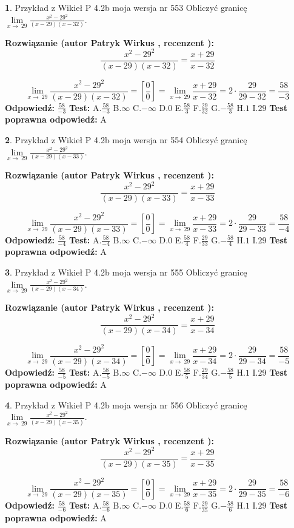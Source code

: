 \documentclass[12pt, a4paper]{article}
\theoremstyle{definition} %
\newtheorem{zad}{}
\newcommand{\zadStart}[1]{\begin{zad}#1\newline}
\newcommand{\zadStop}{\end{zad}}
\newcommand{\rozwStart}[2]{\noindent \textbf{Rozwiązanie (autor #1 , recenzent #2): }\newline}
\newcommand{\rozwStop}{\newline}
\newcommand{\odpStart}{\noindent \textbf{Odpowiedź:}\newline}
\newcommand{\odpStop}{\newline}
\newcommand{\testStart}{\noindent \textbf{Test:}\newline}
\newcommand{\testStop}{\newline}
\newcommand{\kluczStart}{\noindent \textbf{Test poprawna odpowiedź:}\newline}
\newcommand{\kluczStop}{\newline}
\begin{document}
\zadStart{Przykład z Wikieł P 4.2b moja wersja nr 553}
Obliczyć granicę $\lim\limits_{x\to\ 29}\frac{x^{2}-29^{2}}{(x-29)(x-32)}$.
\zadStop
\rozwStart{Patryk Wirkus}{}
$$\frac{x^{2}-29^{2}}{(x-29)(x-32)}=\frac{x+29}{x-32}$$

$$\lim\limits_{x\to\ 29}\frac{x^{2}-29^{2}}{(x-29)(x-32)}=[\frac{0}{0}]=\lim\limits_{x\to\ 29}\frac{x+29}{x-32}=2 \cdot \frac{29}{29-32} = \frac{58}{-3}$$
\rozwStop
\odpStart
$\frac{58}{-3}$
\odpStop
\testStart
A.$\frac{58}{-3}$
B.$\infty$
C.$-\infty$
D.$0$
E.$\frac{58}{3}$
F.$\frac{29}{32}$
G.$-\frac{58}{3}$
H.$1$
I.$29$
\testStop
\kluczStart
A
\kluczStop



\zadStart{Przykład z Wikieł P 4.2b moja wersja nr 554}
Obliczyć granicę $\lim\limits_{x\to\ 29}\frac{x^{2}-29^{2}}{(x-29)(x-33)}$.
\zadStop
\rozwStart{Patryk Wirkus}{}
$$\frac{x^{2}-29^{2}}{(x-29)(x-33)}=\frac{x+29}{x-33}$$

$$\lim\limits_{x\to\ 29}\frac{x^{2}-29^{2}}{(x-29)(x-33)}=[\frac{0}{0}]=\lim\limits_{x\to\ 29}\frac{x+29}{x-33}=2 \cdot \frac{29}{29-33} = \frac{58}{-4}$$
\rozwStop
\odpStart
$\frac{58}{-4}$
\odpStop
\testStart
A.$\frac{58}{-4}$
B.$\infty$
C.$-\infty$
D.$0$
E.$\frac{58}{4}$
F.$\frac{29}{33}$
G.$-\frac{58}{4}$
H.$1$
I.$29$
\testStop
\kluczStart
A
\kluczStop



\zadStart{Przykład z Wikieł P 4.2b moja wersja nr 555}
Obliczyć granicę $\lim\limits_{x\to\ 29}\frac{x^{2}-29^{2}}{(x-29)(x-34)}$.
\zadStop
\rozwStart{Patryk Wirkus}{}
$$\frac{x^{2}-29^{2}}{(x-29)(x-34)}=\frac{x+29}{x-34}$$

$$\lim\limits_{x\to\ 29}\frac{x^{2}-29^{2}}{(x-29)(x-34)}=[\frac{0}{0}]=\lim\limits_{x\to\ 29}\frac{x+29}{x-34}=2 \cdot \frac{29}{29-34} = \frac{58}{-5}$$
\rozwStop
\odpStart
$\frac{58}{-5}$
\odpStop
\testStart
A.$\frac{58}{-5}$
B.$\infty$
C.$-\infty$
D.$0$
E.$\frac{58}{5}$
F.$\frac{29}{34}$
G.$-\frac{58}{5}$
H.$1$
I.$29$
\testStop
\kluczStart
A
\kluczStop



\zadStart{Przykład z Wikieł P 4.2b moja wersja nr 556}
Obliczyć granicę $\lim\limits_{x\to\ 29}\frac{x^{2}-29^{2}}{(x-29)(x-35)}$.
\zadStop
\rozwStart{Patryk Wirkus}{}
$$\frac{x^{2}-29^{2}}{(x-29)(x-35)}=\frac{x+29}{x-35}$$

$$\lim\limits_{x\to\ 29}\frac{x^{2}-29^{2}}{(x-29)(x-35)}=[\frac{0}{0}]=\lim\limits_{x\to\ 29}\frac{x+29}{x-35}=2 \cdot \frac{29}{29-35} = \frac{58}{-6}$$
\rozwStop
\odpStart
$\frac{58}{-6}$
\odpStop
\testStart
A.$\frac{58}{-6}$
B.$\infty$
C.$-\infty$
D.$0$
E.$\frac{58}{6}$
F.$\frac{29}{35}$
G.$-\frac{58}{6}$
H.$1$
I.$29$
\testStop
\kluczStart
A
\kluczStop
\end{document}
